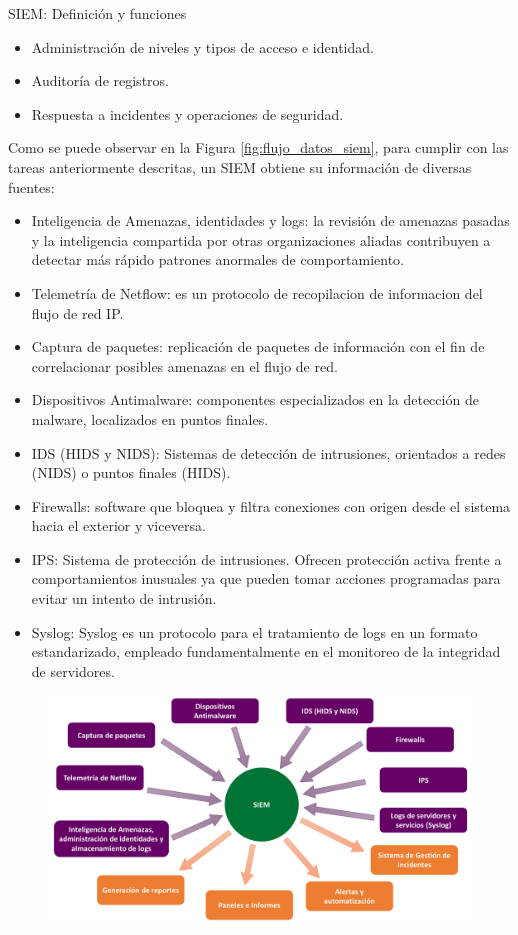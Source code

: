 \begin{section}{SIEM: Definición y funciones}
\begin{itemize}
        \item Administración de niveles y tipos de acceso e identidad.
        \item Auditoría de registros.
        \item Respuesta a incidentes y operaciones de seguridad.
    \end{itemize}
    Como se puede observar en la Figura \ref{fig:flujo_datos_siem}, para cumplir con las tareas anteriormente descritas, un SIEM obtiene su información de diversas fuentes:
    \begin{itemize}
        \item Inteligencia de Amenazas, identidades y logs: la revisión de amenazas pasadas y la inteligencia compartida por otras organizaciones aliadas contribuyen a detectar más rápido patrones anormales de comportamiento.
        \item Telemetría de Netflow: es un protocolo de recopilacion de informacion del flujo de red IP.
        \item Captura de paquetes: replicación de paquetes de información con el fin de correlacionar posibles amenazas en el flujo de red.
        \item Dispositivos Antimalware: componentes especializados en la detección de malware, localizados en puntos finales.
        \item IDS (HIDS y NIDS): Sistemas de detección de intrusiones, orientados a redes (NIDS) o puntos finales (HIDS).
        \item Firewalls: software que bloquea y filtra conexiones con origen desde el sistema hacia el exterior y viceversa.
        \item IPS: Sistema de protección de intrusiones. Ofrecen protección activa frente a comportamientos inusuales ya que pueden tomar acciones programadas para evitar un intento de intrusión.
        \item Syslog: Syslog es un protocolo para el tratamiento de logs en un formato estandarizado, empleado fundamentalmente en el monitoreo de la integridad de servidores.
    \end{itemize}
      \begin{figure}[H]
            \centering
            \includegraphics[width=1\textwidth]{./marco_teorico_imagenes/figura_8_datos_de_un_siem.png}

\end{figure}
\end{section}
